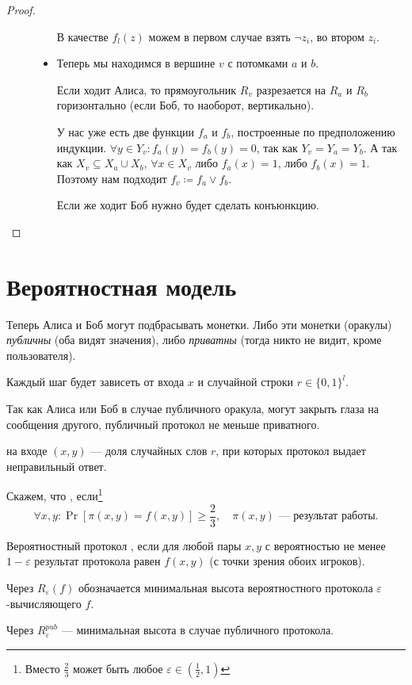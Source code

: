 \begin{proof}
\begin{description}
\begin{itemize}
					В качестве $ f_{l}(z) $ можем в первом случае взять $ \neg z_i$, во втором $z_i$.
				\item Теперь мы находимся в вершине $ v$ с потомками  $ a $ и $ b$.

					Если ходит Алиса, то прямоугольник  $ R_v$ разрезается на   $ R_a$ и  $ R_b$ горизонтально (если  Боб, то наоборот, вертикально).

					У нас уже есть две функции  $ f_a$ и  $ f_b$, построенные по предположению индукции.  $ \forall y \in Y_v\colon  f_a(y) = f_b(y) = 0$, так как $ Y_v = Y_a = Y_b$.
					А так как $ X_v \subseteq X_a \cup X_b$, $ \forall x \in X_v$ либо $ f_a(x) = 1$, либо  $ f_b(x) = 1$.
					Поэтому нам подходит  $ f_v \coloneqq f_a \vee f_b$.

					Если же ходит Боб нужно будет сделать конъюнкцию.
			\end{itemize}
    \end{description} 
\end{proof}


\section{Вероятностная модель}
Теперь Алиса и Боб могут подбрасывать монетки. Либо эти монетки (оракулы) \textit{публичны} (оба видят значения), либо \textit{приватны} (тогда никто не видит, кроме пользователя).

Каждый шаг будет зависеть от входа $ x$ и случайной строки  $ r \in \{0, 1\}^{l}$.

Так как Алиса или Боб в случае публичного оракула, могут закрыть глаза на сообщения другого, публичный протокол не меньше приватного.

 на входе $ (x, y)$ --- доля случайных слов $ r$, при которых протокол выдает неправильный ответ.

Скажем, что , если\footnote{Вместо $\frac{2}{3}$ может быть любое $\varepsilon \in (\frac{1}{2}, 1)$ }
\[
	\forall x, y \colon \Pr[\pi(x, y) = f(x, y)] \ge \frac{2}{3}, \quad \pi(x, y) \text{ --- результат работы}
.\] 
\begin{defn}[]
	Вероятностный протокол , если для любой пары $ x, y$ с вероятностью не менее $ 1 - \varepsilon$ результат протокола равен $ f(x, y)$ (с точки зрения обоих игроков).

	Через $ R_{ \varepsilon }(f) $ обозначается минимальная высота вероятностного протокола $ \varepsilon $-вычисляющего $ f$. 

	Через $ R_{ \varepsilon }^{pub}$ --- минимальная высота в случае публичного протокола.
\end{defn}
